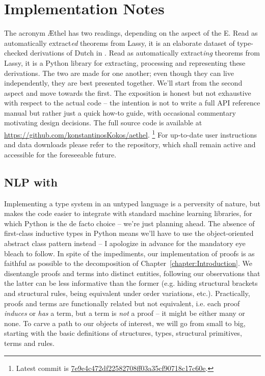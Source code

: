 \chapter{Implementation Notes}
\label{appendix:implementation_notes}

The acronym \AE thel has two readings, depending on the aspect of the E.
Read as automatically extract\textit{ed} theorems from Lassy, it is an elaborate dataset of type-checked derivations of Dutch in \LPplus{}.
Read as automatically extract\textit{ing} theorems from Lassy, it is a Python library for extracting, processing and representing these derivations.
The two are made for one another; even though they can live independently, they are best presented together.
We'll start from the second aspect and move towards the first.
The exposition is honest but not exhaustive with respect to the actual code -- the intention is not to write a full API reference manual but rather just a quick how-to guide, with occasional commentary motivating design decisions.
The full source code is available at \url{https://github.com/konstantinosKokos/aethel}.%
	\footnote{Latest commit is \href{https://github.com/konstantinosKokos/aethel/tree/7e9e4c472df22582708ff03a35cf90718c17c60e}{7e9e4c472df22582708ff03a35cf90718c17c60e}.}
For up-to-date user instructions and data downloads please refer to the repository, which shall remain active and accessible for the foreseeable future.

\section{NLP with \LPplus{}}
\label{subappendix:nlp}
Implementing a type system in an untyped language is a perversity of nature, but makes the code easier to integrate with standard machine learning libraries, for which Python is the de facto choice -- we're just planning ahead.
The absence of first-class inductive types in Python means we'll have to use the object-oriented abstract class pattern instead -- I apologize in advance for the mandatory eye bleach to follow.
In spite of the impediments, our implementation of \LPplus{} proofs is as faithful as possible to the decomposition of Chapter~\ref{chapter:Introduction}.
We disentangle proofs and terms into distinct entities, following our observations that the latter can be less informative than the former (e.g. hiding structural brackets and structural rules, being equivalent under order variations, etc.).
Practically, proofs and terms are functionally related but not equivalent, i.e. each proof \textit{induces} or \textit{has} a term, but a term is \textit{not} a proof -- it might be either many or none.
To carve a path to our objects of interest, we will go from small to big, starting with the basic definitions of structures, types, structural primitives, terms and rules.


